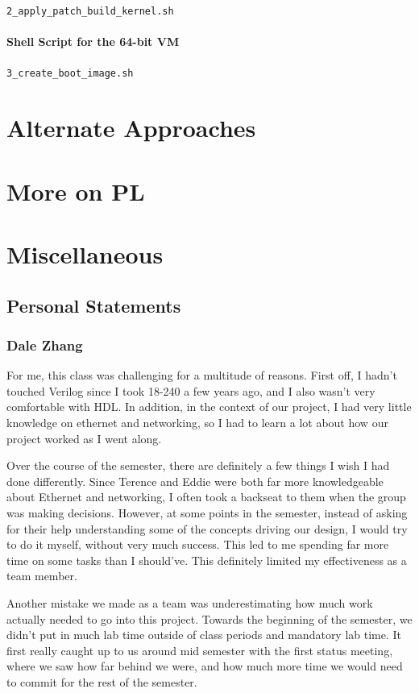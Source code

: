 \documentclass[12pt]{report}
\begin{document}
\texttt{2\_apply\_patch\_build\_kernel.sh}


\subsubsection{Shell Script for the 64-bit VM}
\texttt{3\_create\_boot\_image.sh}

\chapter{Alternate Approaches}

\chapter{More on PL}

\chapter{Miscellaneous}
\section{Personal Statements}
\subsection{Dale Zhang}
For me, this class was challenging for a multitude of reasons. First off, I hadn't touched Verilog since I took 18-240 a few years ago, and I also wasn't very comfortable with HDL. In addition, in the context of our project, I had very little knowledge on ethernet and networking, so I had to learn a lot about how our project worked as I went along.

Over the course of the semester, there are definitely a few things I wish I had done differently. Since Terence and Eddie were both far more knowledgeable about Ethernet and networking, I often took a backseat to them when the group was making decisions. However, at some points in the semester, instead of asking for their help understanding some of the concepts driving our design, I would try to do it myself, without very much success. This led to me spending far more time on some tasks than I should've. This definitely limited my effectiveness as a team member.

Another mistake we made as a team was underestimating how much work actually needed to go into this project. Towards the beginning of the semester, we didn't put in much lab time outside of class periods and mandatory lab time. It first really caught up to us around mid semester with the first status meeting, where we saw how far behind we were, and how much more time we would need to commit for the rest of the semester.
\end{document}
